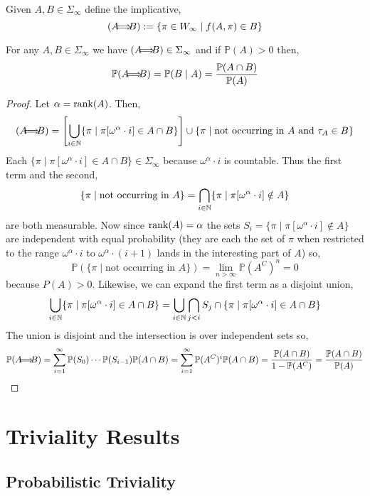 \documentclass[12pt]{article}
\renewcommand{\P}{\mathbb{P}}
\let\oldimplies\implies
\renewcommand{\implies}{\hspace{-1ex} \oldimplies \hspace{-1ex}}
\begin{document}
\begin{defn}
Given $A, B \in \Sigma_{\infty}$ define the implicative,
\[ (A \implies B) := \{ \pi \in W_{\infty} \mid f(A, \pi) \in B \} \] 
\end{defn}

\begin{thm}
For any $A, B \in \Sigma_{\infty}$ we have $(A \implies B) \in \Sigma_{\infty}$ and if $\P(A) > 0$ then,
\[ \P(A \implies B) = \P(B \mid A) = \frac{\P(A \cap B)}{\P(A)} \]
\end{thm}

\begin{proof}
Let $\alpha = \operatorname{\mathrm{rank}}(A)$. Then,
\[ (A \implies B) = \left[ \bigcup_{i \in \N} \{ \pi \mid \pi[\omega^\alpha \cdot i] \in A \cap B \} \right] \cup \{ \pi \mid \text{not occurring in } A \text { and } \tau_A \in B \} \]
Each $\{ \pi \mid \pi[\omega^\alpha \cdot i] \in A \cap B \} \in \Sigma_{\infty}$ because $\omega^\alpha \cdot i$ is countable. Thus the first term and the second, 
\[ \{ \pi \mid \text{not occurring in } A \} = \bigcap_{i \in \mathbb{N}} \{ \pi \mid \pi[\omega^\alpha \cdot i] \notin A \} \]
are both measurable. Now since $\operatorname{\mathrm{rank}}(A) = \alpha$ the sets $S_i = \{ \pi \mid \pi[\omega^\alpha \cdot i] \notin A \}$ are independent with equal probability (they are each the set of $\pi$ when restricted to the range $\omega^\alpha \cdot i$ to $\omega^{\alpha} \cdot (i+1)$ lands in the interesting part of $A$) so,
\[ \P(\{ \pi \mid \text{not occurring in } A \}) = \lim_{n > \infty} \P(A^C)^n = 0 \]
because $P(A) > 0$. Likewise, we can expand the first term as a disjoint union,
\[ \bigcup_{i \in \mathbb{N}} \{ \pi \mid \pi[\omega^\alpha \cdot i] \in A \cap B \} = \bigcup_{i \in \mathbb{N}} \bigcap_{j < i} S_j \cap \{ \pi \mid \pi[\omega^\alpha \cdot i] \in A \cap B \} \]
The union is disjoint and the intersection is over independent sets so,
\[ \P(A \implies B) = \sum_{i = 1}^\infty \P(S_0) \cdots \P(S_{i-1}) \P(A \cap B) = \sum_{i = 1}^{\infty} \P(A^C)^i \P(A \cap B) = \frac{\P(A \cap B)}{1 - \P(A^C)} = \frac{\P(A \cap B)}{\P(A)} \]
\end{proof}

\section{Triviality Results}

\subsection{Probabilistic Triviality}
\end{document}

